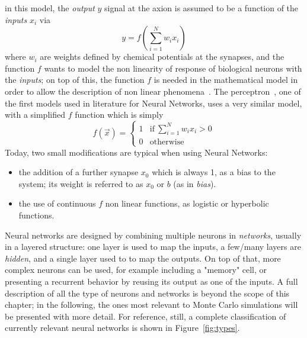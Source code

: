  in this model, the \emph{output} $y$ signal at the axion is assumed to be a function of the \emph{inputs} $x_i$ via
 \begin{equation}
   y = f(\sum_{i=1}^{N} w_i x_i)
   \label{eq:artificialneuron}
 \end{equation}
where $w_i$ are weights defined by chemical potentials at the synapses, and the function $f$ wants to model the non linearity of response of biological neurons with the \emph{inputs}; on top of this, the function $f$ is needed in the mathematical model in order to allow the description of non linear phenomena~\cite{nonlinearitytheorem}. The perceptron~\cite{perceptron}, one of the first models used in literature for Neural Networks, uses a very similar model, with a simplified $f$ function which is simply
\begin{equation}
  f(\vec{x})= \begin{cases}
                1 &  \text{if}\  \sum_{i=1}^{N} w_i x_i >0 \\
                0 &  \text{otherwise}
              \end{cases}
\end{equation}
Today, two small modifications are typical when using Neural Networks:
\begin{itemize}
\item the addition of a further synapse $x_0$ which is always 1, as a bias to the system; its weight is referred to as $x_0$ or $b$ (as in \emph{bias}).
\item the use of continuous $f$ non linear functions, as  logistic or hyperbolic~\cite{logistic} functions.
\end{itemize}
Neural networks are designed by combining multiple neurons in \emph{networks}, usually in a layered structure: one layer is used to map the inputs, a few/many layers are \emph{hidden}, and a single layer used to to map the outputs. On top of that, more complex neurons can be used, for example including a "memory" cell, or presenting a recurrent behavior by reusing its output as one of the inputs. A full description of all the type of neurons and networks is beyond the scope of this chapter; in the following, the ones most relevant to Monte Carlo simulations will be presented with more detail. For reference, still, a complete classification of currently relevant neural networks is shown in Figure~\ref{fig:types}.
